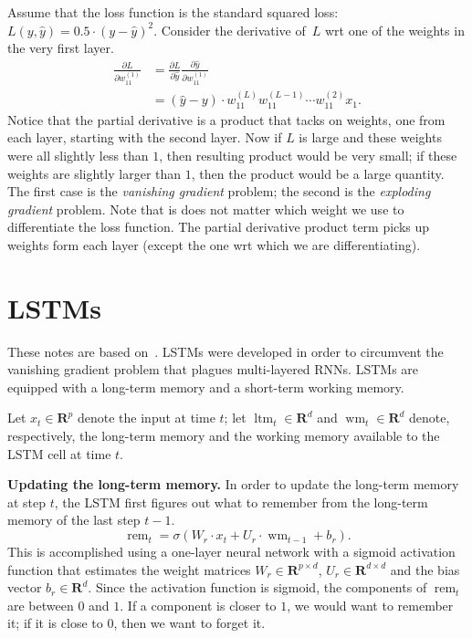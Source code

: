 \documentclass[12pt]{article}
\theoremstyle{definition}
\newcommand{\R}{\ensuremath{\bm{R}}}
\DeclareMathOperator{\rem}{rem}
\DeclareMathOperator{\ltm}{ltm}
\DeclareMathOperator{\wm}{wm}
\begin{document}
Assume that the loss function is the standard squared loss: $L(y, \hat{y}) = 0.5 \cdot (y - \hat{y})^2$. 
Consider the derivative of~$L$ wrt one of the weights in the very first layer. 
\begin{align*}
    \frac{\partial L}{\partial w_{11}^{(1)}} & = 
        \frac{\partial L}{\partial \hat{y}}
        \frac{\partial \hat{y}}{\partial w_{11}^{(1)}} \\
        & = (\hat{y} - y) \cdot w_{11}^{(L)} w_{11}^{(L - 1)} \cdots w_{11}^{(2)} x_1. 
\end{align*}
Notice that the partial derivative is a product that tacks on weights, one from each 
layer, starting with the second layer. Now if $L$ is large and these weights were 
all slightly less than $1$, then resulting product would be very small; if these weights 
are slightly larger than $1$, then the product would be a large quantity. The first 
case is the \emph{vanishing gradient} problem; the second is the 
\emph{exploding gradient} problem. Note that is does not matter which 
weight we use to differentiate the loss function. The partial derivative product 
term picks up weights form each layer (except the one wrt which we are differentiating). 
 


\section{LSTMs}
These notes are based on~\cite{EChen,COlah}. LSTMs were developed in order to
circumvent the vanishing gradient problem that
plagues multi-layered RNNs. LSTMs are equipped with a long-term memory and a
short-term working memory.

Let $x_t \in \R^{p}$ denote the input at time $t$; let $\ltm_{t} \in \R^{d}$
and $\wm_{t} \in \R^{d}$ denote, respectively, the long-term memory and the
working memory available to the LSTM cell at time $t$.

\medskip

\noindent \textbf{Updating the long-term memory.} In order to update the long-term
memory at step $t$, the LSTM first figures out what to remember from the
long-term memory of the last step $t - 1$.
\begin{equation}
\rem_{t} = \sigma \left ( W_r \cdot x_t + U_r \cdot \wm_{t - 1} + b_r \right ).
\end{equation}
This is accomplished using a one-layer neural network with a sigmoid activation
function that estimates the weight matrices $W_r \in \R^{p \times d}$,
$U_r \in \R^{d \times d}$ and the bias vector $b_r \in \R^{d}$. Since the
activation function is sigmoid, the components of $\rem_t$ are between $0$ and
$1$. If a component is closer to $1$, we would want to remember it; if it is
close to $0$, then we want to forget it.
\end{document}
